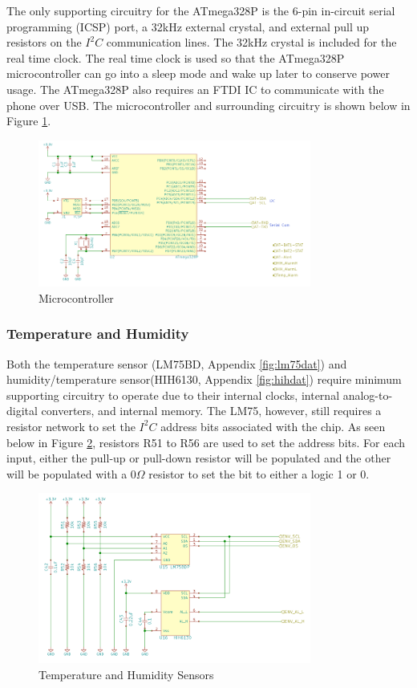\documentclass{article}
\numberwithin{figure}{section}
\numberwithin{equation}{section}
\begin{document}
{The only supporting circuitry for the ATmega328P is the 6-pin in-circuit serial programming (ICSP) port, a 32kHz external crystal, and external pull up resistors on the $I^2 C$ communication lines. The 32kHz crystal is included for the real time clock. The real time clock is used so that the ATmega328P microcontroller can go into a sleep mode and wake up later to conserve power usage. The ATmega328P also requires an FTDI IC to communicate with the phone over USB. The microcontroller and surrounding circuitry is shown below in Figure \ref{fig:mcu}.
\begin{figure}[H]
	\centering
	\includegraphics[width=0.8\textwidth]{Microcontroller}
	\caption{Microcontroller}
	\label{fig:mcu}
\end{figure}

\subsubsection{Temperature and Humidity}

Both the temperature sensor (LM75BD, Appendix \ref{fig:lm75dat}) and humidity/temperature sensor(HIH6130, Appendix \ref{fig:hihdat}) require minimum supporting circuitry to operate due to their internal clocks, internal analog-to-digital converters, and internal memory. The LM75, however, still requires a resistor network to set the $I^2 C$ address bits associated with the chip. As seen below in Figure \ref{fig:tandh}, resistors R51 to R56 are used to set the address bits. For each input, either the pull-up or pull-down resistor will be populated and the other will be populated with a 0$\Omega$ resistor to set the bit to either a logic 1 or 0.

\begin{figure}[H]
	\centering
	\includegraphics[width=0.8\textwidth]{temphumid}
	\caption{Temperature and Humidity Sensors}
	\label{fig:tandh}
\end{figure}

}
\end{document}
